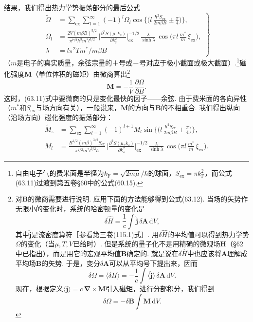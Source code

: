 结果，我们得出热力学势振荡部分的最后公式
\begin{equation}
\left.\begin{aligned}
\widetilde{\Omega}&=\sum_{\mathrm{ex}}\sum_{l=1}^{\infty}(-1)^l\Omega_l
\cos\biggl\{\biggl(l\,\frac{\hbar^2S_{\mathrm{ex}}}{2m\beta B}\pm\frac{\pi}{4}\biggr)\biggr\},\\
\Omega_l&=\frac{2V(m\beta B)^{5/2}}{\pi^{7/2}\hbar^3m^*l^{5/2}}\,
\biggl|\frac{\partial^2S(\mu,k_z)}{\partial k_z^2}\biggr|_{\mathrm{ex}}^{-1/2}\,
\frac{\lambda}{\sinh\lambda}\,
\cos\biggl(\pi l\,\frac{m^*}{m}\,\xi_{\mathrm{ex}}\biggr),\\
\lambda&=l\pi^2Tm^*/m\beta B
\end{aligned}\right\}
\end{equation}
（$m$是电子的真实质量，余弦宗量的＋号或－号对应于极小截面或极大截面）.\footnote{自由电子气的费米面是半径为$k_{\mathrm F}=\sqrt{2m\mu}/\hbar$的球面，$S_{\mathrm{ex}}=\pi k_{\mathrm F}^2$，而公式(63.11)过渡到第五卷§60中的公式(60.15).}磁化强度$\bm{M}$（单位体积的磁矩）由微商算出\footnote{对$\bm B$的微商需要进行说明. 应用下面的方法能够得到公式(63.12). 当场的矢势作无限小的变化时，系统的哈密顿量的变化是
\begin{equation*}
\delta\hat H=\frac{1}{c}\int\hat{\bm j}\,\delta\bm A\,\mathrm dV,
\end{equation*}
其中$\hat{\bm j}$是流密度算符［参看第三卷(115.1)式］. 用$\delta\hat H$的平均值可以得到热力学势$\Omega$的变化（当$\mu,T,V$已给时）. 但是系统的量子化不是用精确的微观场$\bm H$（§62中已指出），而是用它的宏观平均值$\bm B$确定的. 就是说在$\delta\hat H$中也应该将$\bm A$理解成平均场$\bm B$的矢势. 于是，变分$\delta\bm A$可以从平均号下提出来，因而
\begin{equation*}
\delta\Omega=\langle\delta H\rangle=-\frac{1}{c}\int\langle\hat{\bm j}\rangle\,\delta\bm A\,\mathrm dV.
\end{equation*}
现在，根据定义$\langle\bm j\rangle=c\,\bm\nabla\times\bm M$引入磁矩，进行分部积分，我们得到
\begin{equation*}
\delta\Omega=-\delta\bm B\int\bm M\,\mathrm dV.
\end{equation*}}
\begin{equation}
\bm{M}=-\frac{1}{V}\,\frac{\partial\Omega}{\partial B}.
\end{equation}
这时，(63.11)式中要微商的只是变化最快的因子——余弦. 由于费米面的各向异性（$m^*$和$S_{\mathrm{ex}}$与场方向有关），一般说来，$\bm{M}$的方向与$\bm{B}$的不相重合. 我们得出纵向（沿场方向）磁化强度的振荡部分：
\begin{equation}
\begin{aligned}
\widetilde{M}_z&=\sum_{\mathrm{ex}}\sum_{l=1}^{\infty}(-1)^{l+1}M_l
\sin\biggl\{\biggl(l\,\frac{\hbar^2S_{\mathrm{ex}}}{2m\beta B}\pm\frac{\pi}{4}\biggr)\biggr\},\\
M_l&=\frac{B^{1/2}(m\beta)^{3/2}S_{\mathrm{ex}}}{\pi^{7/2}m^*l^{3/2}\hbar}\,
\biggl|\frac{\partial^2S(\mu,k_z)}{\partial k_z^2}\biggr|_{\mathrm{ex}}^{-1/2}\,
\frac{\lambda}{\sinh\lambda}\,
\cos\biggl(\pi l\,\frac{m^*}{m}\,\xi_{\mathrm{ex}}\biggr).
\end{aligned}
\end{equation}
